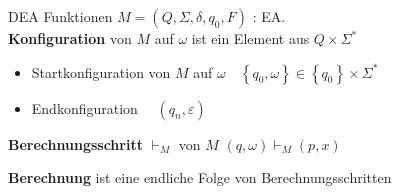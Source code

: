 \begin{KR}{DEA Funktionen}
    $M=\left(Q, \Sigma, \delta, q_{0}, F\right)$ : EA.\\ \textbf{Konfiguration} von $M$ auf $\omega$ ist ein Element aus $Q \times \Sigma^{*}$
    \begin{itemize}
    \item Startkonfiguration von $M$ auf $\omega \quad \left\{q_{0}, \omega\right\} \in\left\{q_{0}\right\} \times \Sigma^{*}$
    \item Endkonfiguration $\quad \left(q_{n}, \varepsilon\right)$
    \end{itemize}

    \textbf{Berechnungsschritt} $\vdash_{M}$ von $M$
    $
    (q, \omega) \vdash_{M}(p, x)
    $

    \textbf{Berechnung} ist eine endliche Folge von Berechnungsschritten
\end{KR}

